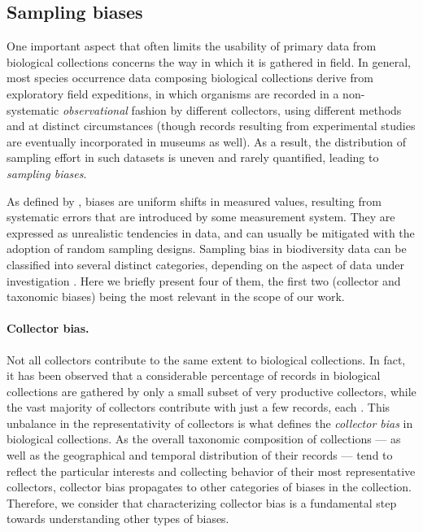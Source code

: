 \subsection{Sampling biases}
One important aspect that often limits the usability of primary data from biological collections concerns the way in which it is gathered in field.
In general, most species occurrence data composing biological collections derive from exploratory field expeditions, in which organisms are recorded in a non-systematic \textit{observational} fashion by different collectors, using different methods and at distinct circumstances (though records resulting from experimental studies are eventually incorporated in museums as well). 
As a result, the distribution of sampling effort in such datasets is uneven and rarely quantified, leading to \textit{sampling biases}.

As defined by , biases are uniform shifts in measured values, resulting from systematic errors that are introduced by some measurement system.
They are expressed as unrealistic tendencies in data, and can usually be mitigated with the adoption of random sampling designs.
%
Sampling bias in biodiversity data can be classified into several distinct categories, depending on the aspect of data under investigation \cite{Daru2017}.
Here we briefly present four of them, the first two (collector and taxonomic biases) being the most relevant in the scope of our work.
%
\paragraph*{Collector bias.}
Not all collectors contribute to the same extent to biological collections.
In fact, it has been observed that a considerable percentage of records in biological collections are gathered by only a small subset of very productive collectors, while the vast majority of collectors contribute with just a few records, each \cite{Daru2017,Carine2012}.
This unbalance in the representativity of collectors is what defines the \textit{collector bias} in biological collections.
As the overall taxonomic composition of collections --- as well as the geographical and temporal distribution of their records --- tend to reflect the particular interests and collecting behavior of their most representative collectors, collector bias propagates to other categories of biases in the collection. Therefore, we consider that characterizing collector bias is a fundamental step towards understanding other types of biases.

